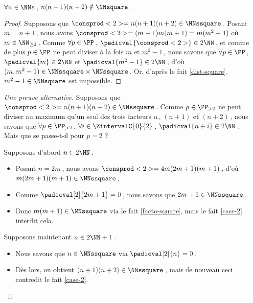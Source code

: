 \begin{fact} \label{case-3}
	 $\forall n \in \NNs$\,, $n(n+1)(n+2) \notin \NNsquare$\,.
\end{fact}




\begin{proof}
    Supposons que $\consprod<2> = n(n+1)(n+2) \in \NNssquare$\,.
    Posant $m = n+1$\,, nous avons $\consprod<2> = (m-1)m(m+1) = m(m^2 - 1)$ où $m \in \NN_{\geq 2}$\,.
    Comme $\forall p \in \PP$\,, $\padicval{\consprod<2>} \in 2 \NN$\,, et comme de plus $p \in \PP$ ne peut diviser à la fois $m$ et $m^2 - 1$\,, nous savons que 
    $\forall p \in \PP$\,, 
    $\padicval{m} \in 2 \NN$ et $\padicval{m^2 - 1} \in 2 \NN$\,,
    d'où 
    $(m, m^2 - 1) \in \NNssquare \times \NNssquare$\,.
    Or, d'après le fait \ref{dist-square}, $m^2 - 1 \in \NNsquare$ est impossible.
\end{proof}




\begin{proof}[Une preuve alternative]
    Supposons que $\consprod<2> = n(n+1)(n+2) \in \NNssquare$\,.
    Comme $p \in \PP_{>2}$ ne peut diviser au maximum qu'un seul des trois facteurs $n$\,, $(n+1)$ et $(n+2)$\,, nous savons que 
    $\forall p \in \PP_{>2}$\,, 
    $\forall i \in \ZintervalC{0}{2}$\,, 
    $\padicval{n + i} \in 2 \NN$\,.
    Mais que se passe-t-il pour $p = 2$ ?
    
    \medskip
    
    Supposons d'abord $n \in 2 \NN$\,.
	\begin{itemize}
		\item Posant $n = 2 m$\,, nous avons $\consprod<2> = 4 m(2m+1)(m+1)$\,, d'où $m(2m+1)(m+1) \in \NNssquare$\,.
		
		\item Comme $\padicval[2]{2m+1} = 0$\,, nous savons que $2m+1 \in \NNssquare$\,.
		
		\item Donc $m(m+1)\in \NNssquare$ via le fait \ref{facto-square}, mais le fait \ref{case-2} interdit cela.
	\end{itemize}
    
    \medskip
    
    Supposons maintenant $n \in 2 \NN + 1$\,.
	\begin{itemize}
		\item Nous savons que $n \in \NNssquare$ via $\padicval[2]{n} = 0$\,.

		\item Dès lors, on obtient $(n+1)(n+2) \in \NNssquare$\,, mais de nouveau ceci contredit le fait \ref{case-2}. \qedhere
	\end{itemize}
\end{proof}